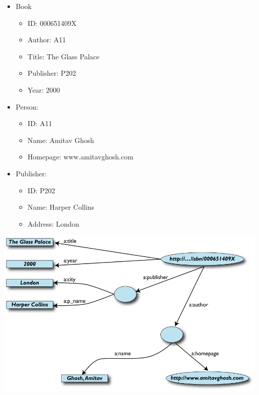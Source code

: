 \documentclass[a4paper,landscape,headrule,footrule,xetex]{foils}
\begin{document}

\noindent
\begin{itemize}\addtolength{\itemsep}{-1ex}

\item Book
  \begin{itemize}
  \item ID: 000651409X
  \item Author: A11
  \item Title: The Glass Palace
  \item Publisher: P202
  \item Year: 2000
  \end{itemize}
\item Person:
  \begin{itemize}
  \item ID: A11 
  \item Name: Amitav Ghosh
  \item Homepage: www.amitavghosh.com
  \end{itemize}
\item Publisher:
  \begin{itemize}
  \item ID: P202 
  \item Name: Harper Collins
  \item Address: London
  \end{itemize}

\end{itemize}


\noindent
\includegraphics[width=\textwidth]{../pics/img16.png}
\end{document}
